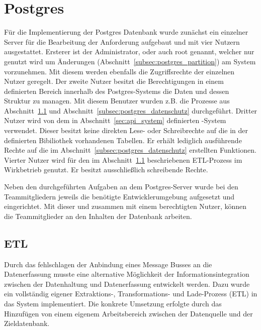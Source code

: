 \section{Postgres}
Für die Implementierung der Postgres Datenbank wurde zunächst ein einzelner
Server für die Bearbeitung der Anforderung aufgebaut und mit vier Nutzern
ausgestattet. Ersterer ist der Administrator, oder auch root genannt, welcher
nur genutzt wird um Änderungen (Abschnitt~\ref{subsec:postgres_partition}) am
System vorzunehmen. Mit diesem werden ebenfalls die Zugriffsrechte der
einzelnen Nutzer geregelt. Der zweite Nutzer besitzt die Berechtigungen in
einem definierten Bereich innerhalb des Postgres\hyp{}Systems die
Daten und dessen Struktur zu managen. Mit diesem Benutzer wurden z.B. die
Prozesse aus Abschnitt~\ref{subsec:postgres_etl} und
Abschnitt~\ref{subsec:postgres_datenschutz} durchgeführt. Dritter Nutzer wird
von dem in Abschnitt~\ref{sec:api_system} definierten \hyp{}System
verwendet. Dieser besitzt keine direkten Lese\hyp{} oder Schreibrechte auf die
in der definierten Bibiliothek vorhandenen Tabellen. Er erhält lediglich
ausführende Rechte auf die im Abschnitt~\ref{subsec:postgres_datenschutz}
erstellten Funktionen. Vierter Nutzer wird für den im
Abschnitt~\ref{subsec:postgres_etl} beschriebenen ETL\hyp{}Prozess im
Wirkbetrieb genutzt. Er besitzt ausschließlich schreibende Rechte.

Neben den durchgeführten Aufgaben an dem Postgres\hyp{}Server wurde bei den
Teammitgliedern jeweils die benötigte Entwicklerumgebung aufgesetzt und
eingerichtet. Mit dieser und zusammen mit einem berechtigten Nutzer, können die
Teammitglieder an den Inhalten der Datenbank arbeiten.
\nl%

\subsection{ETL}
\label{subsec:postgres_etl}
Durch das fehlschlagen der Anbindung eines Message Busses an die Datenerfassung
musste eine alternative Möglichkeit der Informationsintegration zwischen der
Datenhaltung und Datenerfassung entwickelt werden. Dazu wurde ein vollständig
eigener Extraktions-, Transformations- und Lade-Prozess (ETL) in das System
implementiert. Die konkrete Umsetzung erfolgte durch das Hinzufügen von einem
eigenem Arbeitsbereich zwischen der Datenquelle und der Zieldatenbank.

